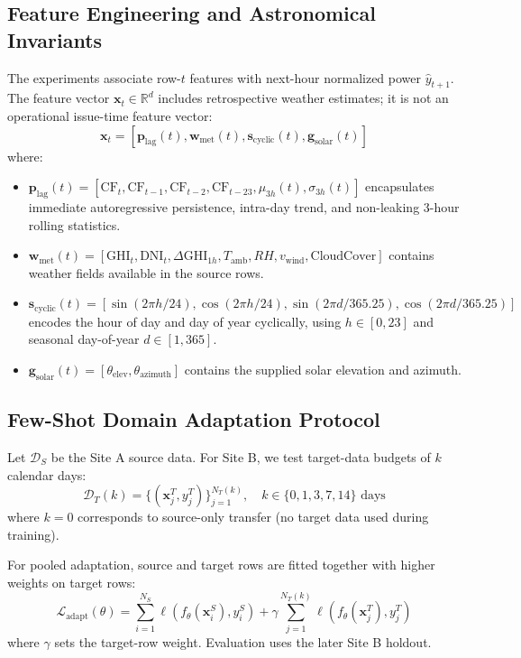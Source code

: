 \documentclass[preprint,12pt,authoryear]{elsarticle}
\begin{document}
\subsection{Feature Engineering and Astronomical Invariants}
The experiments associate row-$t$ features with next-hour normalized power $\hat{y}_{t+1}$. The feature vector $\mathbf{x}_t \in \mathbb{R}^d$ includes retrospective weather estimates; it is not an operational issue-time feature vector:
\begin{equation}
    \mathbf{x}_t = \left[ \mathbf{p}_{\text{lag}}(t), \mathbf{w}_{\text{met}}(t), \mathbf{s}_{\text{cyclic}}(t), \mathbf{g}_{\text{solar}}(t) \right]
\end{equation}
where:
\begin{itemize}
    \item $\mathbf{p}_{\text{lag}}(t) = [\text{CF}_t, \text{CF}_{t-1}, \text{CF}_{t-2}, \text{CF}_{t-23}, \mu_{3h}(t), \sigma_{3h}(t)]$ encapsulates immediate autoregressive persistence, intra-day trend, and non-leaking 3-hour rolling statistics.
    \item $\mathbf{w}_{\text{met}}(t) = [\text{GHI}_t, \text{DNI}_t, \Delta \text{GHI}_{1h}, T_{\text{amb}}, RH, v_{\text{wind}}, \text{CloudCover}]$ contains weather fields available in the source rows.
    \item $\mathbf{s}_{\text{cyclic}}(t) = [\sin(2\pi h/24), \cos(2\pi h/24), \sin(2\pi d/365.25), \cos(2\pi d/365.25)]$ encodes the hour of day and day of year cyclically, using $h \in [0, 23]$ and seasonal day-of-year $d \in [1, 365]$.
    \item $\mathbf{g}_{\text{solar}}(t) = [\theta_{\text{elev}}, \theta_{\text{azimuth}}]$ contains the supplied solar elevation and azimuth.
\end{itemize}

\subsection{Few-Shot Domain Adaptation Protocol}
Let $\mathcal{D}_S$ be the Site A source data. For Site B, we test target-data budgets of $k$ calendar days:
\begin{equation}
    \mathcal{D}_T(k) = \{(\mathbf{x}_j^T, y_j^T)\}_{j=1}^{N_T(k)}, \quad k \in \{0, 1, 3, 7, 14\} \text{ days}
\end{equation}
where $k=0$ corresponds to source-only transfer (no target data used during training).

For pooled adaptation, source and target rows are fitted together with higher weights on target rows:
\begin{equation}
    \mathcal{L}_{\text{adapt}}(\theta) = \sum_{i=1}^{N_S} \ell(f_\theta(\mathbf{x}_i^S), y_i^S) + \gamma \sum_{j=1}^{N_T(k)} \ell(f_\theta(\mathbf{x}_j^T), y_j^T)
\end{equation}
where $\gamma$ sets the target-row weight. Evaluation uses the later Site B holdout.
\end{document}
